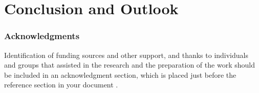 \section{Conclusion and Outlook}
\label{sec:outlook}
\lipsum[1-2]

\subsubsection*{Acknowledgments}

Identification of funding sources and other support, 
and thanks to individuals and groups that assisted in the research 
and the preparation of the work should be included in an acknowledgment section, 
which is placed just before the reference section in your document \cite{acmart}.
